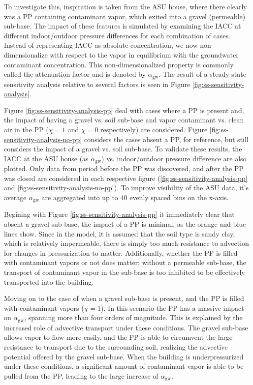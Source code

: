 \documentclass[journal=esthag,manuscript=article]{achemso}
\begin{document}
To investigate this, inspiration is taken from the ASU house, where there clearly was a PP containing contaminant vapor, which exited into a gravel (permeable) sub-base.
The impact of these features is simulated by examining the IACC at different indoor/outdoor pressure differences for each combination of cases.
Instead of representing IACC as absolute concentration, we now non-dimensionalize with respect to the vapor in equilibrium with the groundwater contaminant concentration.
This non-dimensionalized property is commonly called the attenuation factor and is denoted by $\alpha_\mathrm{gw}$.
The result of a steady-state sensitivity analysis relative to several factors is seen in Figure \ref{fig:ss-sensitivity-analysis}.\par

Figure \ref{fig:ss-sensitivity-analysis-pp} deal with cases where a PP is present and, the impact of having a gravel vs. soil sub-base and vapor contaminant vs. clean air in the PP ($\chi=1$ and $\chi=0$ respectively) are considered.
Figure \ref{fig:ss-sensitivity-analysis-no-pp} considers the cases absent a PP, for reference, but still considers the impact of a gravel vs. soil sub-base.
To validate these results, the IACC at the ASU house (as $\alpha_\mathrm{gw}$) vs. indoor/outdoor pressure difference are also plotted.
Only data from period before the PP was discovered, and after the PP was closed are considered in each respective figure (\ref{fig:ss-sensitivity-analysis-pp} and \ref{fig:ss-sensitivity-analysis-no-pp}).
To improve visibility of the ASU data, it's average $\alpha_\mathrm{gw}$ are aggregated into up to 40 evenly spaced bins on the x-axis.\par

Begining with Figure \ref{fig:ss-sensitivity-analysis-pp} it immediately clear that absent a gravel sub-base, the impact of a PP is minimal, as the orange and blue lines show.
Since in the model, it is assumed that the soil type is sandy clay, which is relatively impermeable, there is simply too much resistance to advection for changes in pressurization to matter.
Additionally, whether the PP is filled with contaminant vapors or not does matter; without a permeable sub-base, the transport of contaminant vapor in the sub-base is too inhibited to be effectively transported into the building.\par

Moving on to the case of when a gravel sub-base is present, and the PP is filled with contaminant vapors ($\chi=1$).
In this scenario the PP has a massive impact on $\alpha_\mathrm{gw}$, spanning more than four orders of magnitude.
This is explained by the increased role of advective transport under these conditions.
The gravel sub-base allows vapor to flow more easily, and the PP is able to circumvent the large resistance to transport due to the surrounding soil, realizing the advective potential offered by the gravel sub-base.
When the building is underpressurized under these conditions, a significant amount of contaminant vapor is able to be pulled from the PP, leading to the large increase of $\alpha_\mathrm{gw}$.\par
\end{document}
